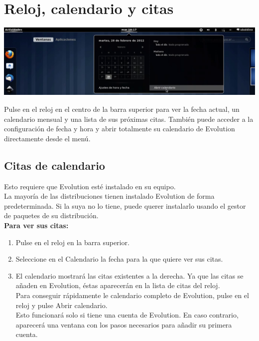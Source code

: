 \section{Reloj, calendario y citas}
\begin{center}
\includegraphics[scale=0.5]{img/calendario.png} 
\end{center}
Pulse en el reloj en el centro de la barra superior para ver la fecha actual, un calendario mensual y una lista de sus próximas citas. También puede acceder a la configuración de fecha y hora y abrir totalmente su calendario de Evolution directamente desde el menú.
\subsection{Citas de calendario}
Esto requiere que Evolution esté instalado en su equipo.\\
La mayoría de las distribuciones tienen instalado Evolution de forma predeterminada. Si la suya no lo tiene, puede querer instalarlo usando el gestor de paquetes de su distribución.\\

{\bf Para ver sus citas:}
\begin{enumerate}
\item Pulse en el reloj en la barra superior.
\item Seleccione en el Calendario la fecha para la que quiere ver sus citas.
\item El calendario mostrará las citas existentes a la derecha. Ya que las citas se añaden en Evolution, éstas aparecerán en la lista de citas del reloj.\\

Para conseguir rápidamente le calendario completo de Evolution, pulse en el reloj y pulse Abrir calendario.\\
Esto funcionará solo si tiene una cuenta de Evolution. En caso contrario, aparecerá una ventana con los pasos necesarios para añadir su primera cuenta.
\end{enumerate}
